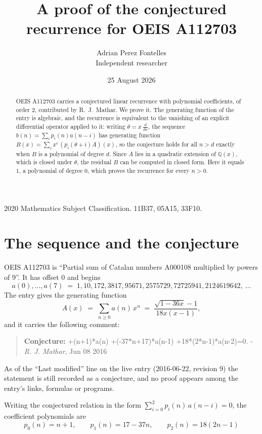 \documentclass[11pt,a4paper]{article}
\title{A proof of the conjectured recurrence for OEIS A112703}
\author{Adrian Perez Fontelles\\ \small Independent researcher}
\date{25 August 2026}
\theoremstyle{plain}
\theoremstyle{definition}
\begin{document}
\maketitle

\begin{abstract}
OEIS A112703 carries a conjectured linear recurrence with polynomial coefficients, of
order 2, contributed by R.~J.~Mathar. We prove it. The generating function of the
entry is algebraic, and the recurrence is equivalent to the vanishing of an explicit
differential operator applied to it: writing $\theta=x\,\frac{d}{dx}$, the sequence
$b(n)=\sum_{i}p_{i}(n)a(n-i)$ has generating function
$B(x)=\sum_{i}x^{i}\,(p_{i}(\theta+i)A)(x)$, so the conjecture holds for all $n>d$ exactly
when $B$ is a polynomial of degree $d$. Since $A$ lies in a quadratic extension of
$\mathbb{Q}(x)$, which is closed under $\theta$, the residual $B$ can be computed in
closed form. Here it equals $1$, a polynomial of degree $0$, which proves
the recurrence for every $n>0$.
\end{abstract}

\noindent\small 2020 Mathematics Subject Classification. 11B37, 05A15, 33F10.\normalsize

\section{The sequence and the conjecture}

OEIS A112703 is ``Partial sum of Catalan numbers A000108 multiplied by powers of 9''. It has offset $0$ and begins
\[
a(0),\dots,a(7)\;=\;1, 10, 172, 3817, 95671, 2575729, 72725941, 2124619642,\ \dots
\]
The entry gives the generating function
\begin{equation}\label{eq:gf}
A(x)\;=\;\sum_{n\ge 0} a(n)\,x^{n}\;=\;\frac{\sqrt{1 - 36 x} - 1}{18 x \left(x - 1\right)} ,
\end{equation}
and it carries the following comment:
\begin{quote}\small
\textbf{Conjecture:} +(n+1)*a(n) +(-37*n+17)*a(n-1) +18*(2*n-1)*a(n-2)=0. - \emph{R. J. Mathar}, Jun 08 2016
\end{quote}
As of the ``Last modified'' line on the live entry (2016-06-22, revision 9) the
statement is still recorded as a conjecture, and no proof appears among the entry's links,
formulas or programs.

Writing the conjectured relation in the form $\sum_{i=0}^{2}p_{i}(n)\,a(n-i)=0$,
the coefficient polynomials are
\[
p_{0}(n)=n + 1,\qquad p_{1}(n)=17 - 37 n,\qquad p_{2}(n)=18 \left(2 n - 1\right)
\]
\end{document}

